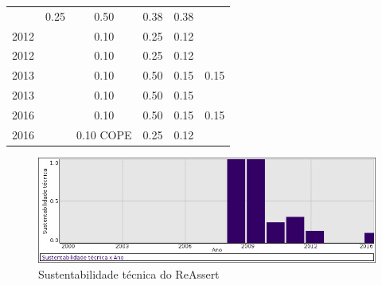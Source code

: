 \begin{table}[H]
\begin{tabular}{| l | c | c | c | c | c |}
          &
          0.25
          &
          0.50
          &
          0.38
          &
            {\color{red} 0.38}
          \\
            2012
          &
          
          &
          0.10
          &
          0.25
          &
          0.12
          &
          \\
            2012
          &
          
          &
          0.10
          &
          0.25
          &
          0.12
          &
          \\
\hline
            2013
          &
          
          &
          0.10
          &
          0.50
          &
          0.15
          &
            {\color{red} 0.15}
          \\
            2013
          &
          
          &
          0.10
          &
          0.50
          &
          0.15
          &
          \\
\hline
            2016
          &
          
          &
          0.10
          &
          0.50
          &
          0.15
          &
            {\color{red} 0.15}
          \\
            2016
          &
          
          &
          0.10
            {\tiny COPE}
          &
          0.25
          &
          0.12
          &
          \\
\hline
\end{tabular}
\end{table}

\begin{figure}[h]
  \center
  \includegraphics[scale=0.50]{imagens/softwares-charts/reassert.png}
  \caption{Sustentabilidade técnica do ReAssert}
\end{figure}



